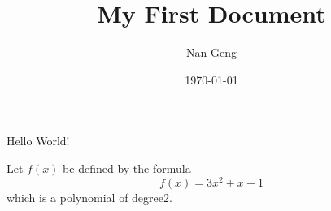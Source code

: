 \documentclass{article}%
\title{My First Document}
\author{Nan Geng}
\date{\today}
\begin{document}
	\maketitle
	Hello World!
	
	Let $f(x)$ be defined by the formula
	$$f(x)=3x^2+x-1$$ which is a polynomial of degree2.
\end{document}
